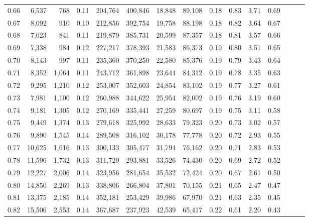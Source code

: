 \begin{tabular}{rrrrrrrrrrrrrrr}
0.66 &   6,537 &    768 &  0.11 &  204,764 &  400,846 &   18,848 &   89,108 &  0.18 &  0.83 &  3.71 &      0.69 \\
0.67 &   8,092 &    910 &  0.10 &  212,856 &  392,754 &   19,758 &   88,198 &  0.18 &  0.82 &  3.64 &      0.67 \\
0.68 &   7,023 &    841 &  0.11 &  219,879 &  385,731 &   20,599 &   87,357 &  0.18 &  0.81 &  3.57 &      0.66 \\
0.69 &   7,338 &    984 &  0.12 &  227,217 &  378,393 &   21,583 &   86,373 &  0.19 &  0.80 &  3.51 &      0.65 \\
0.70 &   8,143 &    997 &  0.11 &  235,360 &  370,250 &   22,580 &   85,376 &  0.19 &  0.79 &  3.43 &      0.64 \\
0.71 &   8,352 &  1,064 &  0.11 &  243,712 &  361,898 &   23,644 &   84,312 &  0.19 &  0.78 &  3.35 &      0.63 \\
0.72 &   9,295 &  1,210 &  0.12 &  253,007 &  352,603 &   24,854 &   83,102 &  0.19 &  0.77 &  3.27 &      0.61 \\
0.73 &   7,981 &  1,100 &  0.12 &  260,988 &  344,622 &   25,954 &   82,002 &  0.19 &  0.76 &  3.19 &      0.60 \\
0.74 &   9,181 &  1,305 &  0.12 &  270,169 &  335,441 &   27,259 &   80,697 &  0.19 &  0.75 &  3.11 &      0.58 \\
0.75 &   9,449 &  1,374 &  0.13 &  279,618 &  325,992 &   28,633 &   79,323 &  0.20 &  0.73 &  3.02 &      0.57 \\
0.76 &   9,890 &  1,545 &  0.14 &  289,508 &  316,102 &   30,178 &   77,778 &  0.20 &  0.72 &  2.93 &      0.55 \\
0.77 &  10,625 &  1,616 &  0.13 &  300,133 &  305,477 &   31,794 &   76,162 &  0.20 &  0.71 &  2.83 &      0.53 \\
0.78 &  11,596 &  1,732 &  0.13 &  311,729 &  293,881 &   33,526 &   74,430 &  0.20 &  0.69 &  2.72 &      0.52 \\
0.79 &  12,227 &  2,006 &  0.14 &  323,956 &  281,654 &   35,532 &   72,424 &  0.20 &  0.67 &  2.61 &      0.50 \\
0.80 &  14,850 &  2,269 &  0.13 &  338,806 &  266,804 &   37,801 &   70,155 &  0.21 &  0.65 &  2.47 &      0.47 \\
0.81 &  13,375 &  2,185 &  0.14 &  352,181 &  253,429 &   39,986 &   67,970 &  0.21 &  0.63 &  2.35 &      0.45 \\
0.82 &  15,506 &  2,553 &  0.14 &  367,687 &  237,923 &   42,539 &   65,417 &  0.22 &  0.61 &  2.20 &      0.43 \\

\end{tabular}
